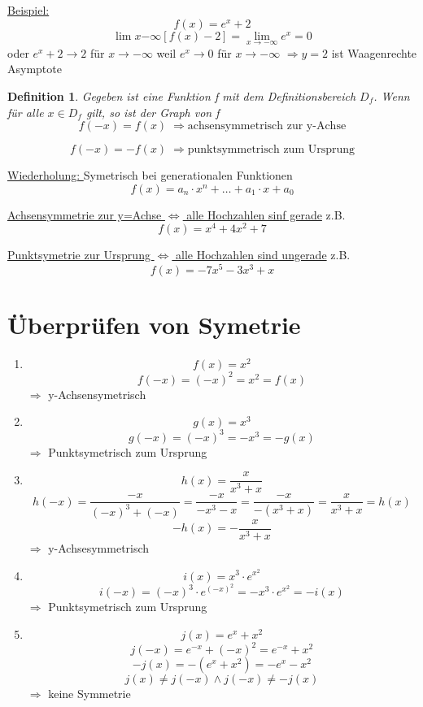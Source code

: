 \documentclass{scrbook}
\newtheorem{definition}{Definition}
\begin{document}
\underline{Beispiel:}
\[f(x) = e^x + 2\]
\[\lim x {-\infty} [f(x) - 2] = \lim_{x \to - \infty} e^x = 0\]
oder $e^x + 2 \rightarrow 2 $ für $ x \rightarrow - \infty $ weil $e^x \rightarrow 0 $ für $ x \rightarrow - \infty$
$ \Rightarrow y = 2 $ ist Waagenrechte Asymptote

\begin{definition}
Gegeben ist eine Funktion f mit dem Definitionsbereich $D_f$. Wenn für alle $x \in D_f$ gilt, so ist der Graph von f
\[f(-x) = f(x) \; \Rightarrow \text{achsensymmetrisch zur y-Achse}\]

\[ f(-x) = -f(x) \; \Rightarrow \text{punktsymmetrisch zum Ursprung}\]

\end{definition}

\underline{Wiederholung: }
Symetrisch bei generationalen Funktionen
\[f(x) = a_n \cdot x^n + \dots +a_1 \cdot x + a_0\]

\underline{Achsensymmetrie zur y=Achse $\Leftrightarrow$ alle Hochzahlen sinf gerade}
z.B. \[f(x) = x^4 + 4x^2 + 7\]

\underline{Punktsymetrie zur Ursprung $ \Leftrightarrow $ alle Hochzahlen sind ungerade}
z.B. \[f(x) = -7x^5 - 3x^3 + x\]

\chapter{Überprüfen von Symetrie}

\begin{enumerate}
\item
\[f(x) = x^2\]
\[f(-x) = (-x)^2 = x^2 = f(x)\]
$\Rightarrow$ y-Achsensymetrisch

\item
\[ g(x) = x^3\]
\[g(-x) = (-x)^3 = -x^3 = -g(x)\]
$ \Rightarrow$ Punktsymetrisch zum Ursprung
\item
\[h(x) = \frac{x} {x^3 + x}\]
\[h(-x) = \frac{-x}{(-x)^3+(-x)} = \frac{-x}{-x^3-x} = \frac{-x}{-(x^3+x)} = \frac x {x^3+x} = h(x)\]
\[-h(x) = -\frac{x} {x^3 + x}\]
$\Rightarrow$ y-Achsesymmetrisch

\item
\[i(x) = x^3 \cdot e^{x^2}\]
\[i(-x) = (-x)^3 \cdot e^{(-x)^2} = -x^3 \cdot e^{x^2} = -i(x)\]
$\Rightarrow$ Punktsymetrisch zum Ursprung

\item
\[ j(x) = e^x + x^2\]
\[j(-x) = e^{-x} + (-x)^2 = e^{-x} + x^2\]
\[-j(x) = -( e^x + x^2) = -e^x - x^2\]
\[j(x) \not = j(-x) \land j(-x) \not = -j(x)\]
$\Rightarrow$ keine Symmetrie

\end{enumerate}
\end{document}
